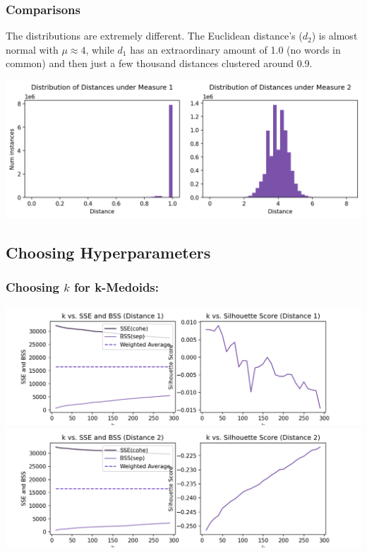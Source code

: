 \documentclass[fleqn]{article}
\begin{document}
\subsubsection{Comparisons}
The distributions are extremely different.  The Euclidean distance's ($d_{2}$) is almost normal with $\mu \approx 4$, while $d_{1}$ has an extraordinary amount of 1.0 (no words in common) and then just a few thousand distances clustered around 0.9.
\begin{center}
    \includegraphics[scale=0.50]{images/distance_distributions_horizontal.png}
\end{center}

\subsection{Choosing Hyperparameters}
\subsubsection{Choosing $k$ for k-Medoids:}
\begin{center}
    \includegraphics[scale=0.40]{images/d1_ks.png}\includegraphics[scale=0.40]{images/d2_ks.png}
\end{center}
\end{document}
